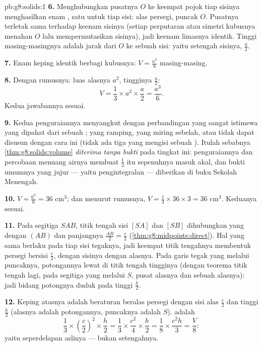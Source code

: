 \begin{solution}{pb:g8:solids:1}
\textbf{6.} Menghubungkan pusatnya $O$ ke keempat pojok tiap
sisinya menghasilkan enam , satu untuk tiap sisi: alas persegi,
puncak $O$. Pusatnya terletak sama terhadap keenam sisinya (setiap
perputaran atau simetri kubusnya menahan $O$ lalu mempermutasikan
sisinya), jadi keenam limasnya identik. Tinggi masing-masingnya
adalah jarak dari $O$ ke sebuah sisi: yaitu setengah sisinya, $\frac{a}{2}$.

\textbf{7.} Enam keping identik berbagi kubusnya:
$V = \frac{a^3}{6}$ masing-masing.

\textbf{8.} Dengan rumusnya: luas alasnya $a^2$, tingginya $\frac a2$:
\[
V = \frac13 \times a^2 \times \frac{a}{2} = \frac{a^3}{6} .
\]
Kedua jawabannya sesuai.

\textbf{9.} Kedua penguraiannya menyangkut  dengan perbandingan
yang sangat istimewa yang dipahat dari sebuah ;  yang
ramping,  yang miring sebelah, atau  tidak dapat disusun
dengan cara ini (tidak ada tiga  yang mengisi
sebuah ). Itulah sebabnya \cref{thm:g8:solids:volume}
\emph{diterima tanpa bukti} pada tingkat ini: penguraiannya dan
percobaan menuang airnya membuat $\frac13$ itu sepenuhnya masuk akal,
dan bukti umumnya yang jujur --- yaitu pengintegralan --- diberikan di
buku Sekolah Menengah.

\textbf{10.} $V = \frac{6^3}{6} = 36$ cm$^3$; dan menurut rumusnya,
$V = \frac13 \times 36 \times 3 = 36$ cm$^3$. Keduanya sesuai.

\textbf{11.} Pada segitiga $SAB$, titik tengah sisi
$[SA]$ dan $[SB]$ dihubungkan  yang  dengan $(AB)$
dan panjangnya $\frac{AB}{2} = \frac{c}{2}$
(\cref{thm:g8:midpoints:direct}). Hal yang sama berlaku pada tiap
sisi tegaknya, jadi keempat titik tengahnya membentuk persegi bersisi
$\frac c2$, dengan sisinya  dengan alasnya. Pada garis tegak
yang melalui puncaknya, potongannya lewat di titik tengah tingginya
(dengan teorema titik tengah lagi, pada segitiga yang melalui $S$,
pusat alasnya dan sebuah  alasnya): jadi bidang
potongnya duduk pada tinggi $\frac h2$.

\textbf{12.} Keping atasnya adalah  beraturan beralas persegi
dengan sisi alas $\frac c2$ dan tinggi $\frac h2$ (alasnya adalah
potongannya, puncaknya adalah $S$).  adalah
\[
\frac13 \times \left(\frac c2\right)^2 \times \frac h2
= \frac13 \times \frac{c^2}{4} \times \frac h2
= \frac{1}{8} \times \frac{c^2 h}{3}
= \frac{V}{8} :
\]
yaitu seperdelapan aslinya --- bukan setengahnya.


\end{solution}
